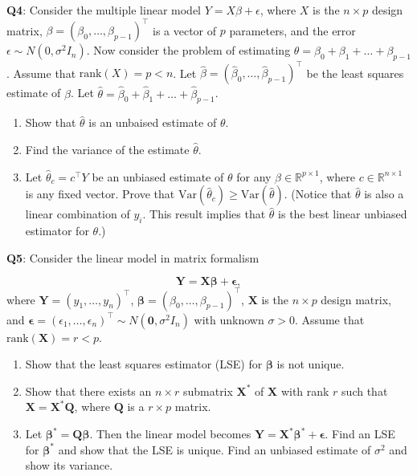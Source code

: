\documentclass[]{article}
\begin{document}
\textbf{Q4}: Consider the multiple linear model
\(Y = X\beta +\epsilon\), where \(X\) is the \(n\times p\) design
matrix, \(\beta=(\beta_0,\dots,\beta_{p-1})^\top\) is a vector of \(p\)
parameters, and the error \(\epsilon\sim N(0,\sigma^2 I_n)\). Now
consider the problem of estimating
\(\theta = \beta_0+\beta_1+\dots+\beta_{p-1}\). Assume that
\(\mathrm{rank}(X)=p<n\). Let
\(\hat\beta=(\hat\beta_0,\dots,\hat\beta_{p-1})^\top\) be the least
squares estimate of \(\beta\). Let
\(\hat\theta=\hat\beta_0+\hat\beta_1+\dots+\hat\beta_{p-1}\).

\begin{enumerate}
\def\labelenumi{(\alph{enumi})}
\item
  Show that \(\hat\theta\) is an unbaised estimate of \(\theta\).
\item
  Find the variance of the estimate \(\hat\theta\).
\item
  Let \(\hat\theta_c=c^\top Y\) be an unbiased estimate of \(\theta\)
  for any \(\beta\in \mathbb{R}^{p\times 1}\), where
  \(c\in \mathbb{R}^{n\times 1}\) is any fixed vector. Prove that
  \(\mathrm{Var}(\hat\theta_c)\ge \mathrm{Var}(\hat\theta)\). (Notice
  that \(\hat\theta\) is also a linear combination of \(y_i\). This
  result implies that \(\hat\theta\) is the best linear unbiased
  estimator for \(\theta\).)
\end{enumerate}

\textbf{Q5}: Consider the linear model in matrix formalism

\[
\boldsymbol{Y} = \boldsymbol{X}\boldsymbol {\beta} + \boldsymbol\epsilon,
\] where \(\boldsymbol Y=(y_1,\dots,y_n)^\top\),
\(\boldsymbol\beta=(\beta_0,\dots,\beta_{p-1})^\top\), \(\boldsymbol X\)
is the \(n\times p\) design matrix, and
\(\boldsymbol\epsilon=(\epsilon_1,\dots,\epsilon_n)^\top\sim N(\boldsymbol 0,\sigma^2 I_n)\)
with unknown \(\sigma>0\). Assume that
\(\mathrm{rank}(\boldsymbol{X})=r<p\).

\begin{enumerate}
\def\labelenumi{(\alph{enumi})}
\item
  Show that the least squares estimator (LSE) for \(\boldsymbol\beta\)
  is not unique.
\item
  Show that there exists an \(n\times r\) submatrix \(\boldsymbol{X}^*\)
  of \(\boldsymbol{X}\) with rank \(r\) such that
  \(\boldsymbol{X}=\boldsymbol{X}^*\boldsymbol{Q}\), where
  \(\boldsymbol{Q}\) is a \(r\times p\) matrix.
\item
  Let \(\boldsymbol\beta^* = \boldsymbol{Q\beta}\). Then the linear
  model becomes
  \(\boldsymbol{Y} = \boldsymbol{X}^*\boldsymbol {\beta}^* + \boldsymbol\epsilon\).
  Find an LSE for \(\boldsymbol\beta^*\) and show that the LSE is
  unique. Find an unbiased estimate of \(\sigma^2\) and show its
  variance.
\end{enumerate}
\end{document}
